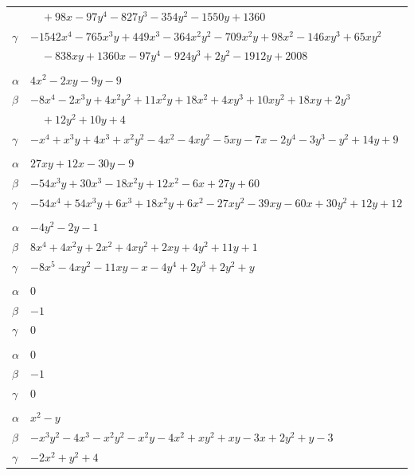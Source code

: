 \documentclass[11pt]{article}
\begin{document}
\begin{longtable}{@{}ll@{}}
 & $\quad +98x-97y^{4}-827y^{3}-354y^{2}-1550y+1360$\\
$\gamma$ & $-1542x^{4}-765x^{3}y+449x^{3}-364x^{2}y^{2}-709x^{2}y+98x^{2}-146xy^{3}+65xy^{2}$\\
 & $\quad -838xy+1360x-97y^{4}-924y^{3}+2y^{2}-1912y+2008$\\
\addlinespace[3pt]
\multicolumn{2}{@{}l}{$\{i,j\}=\{14,72\}$, $k_{ij}=3^{2}$}\\
$\alpha$ & $4x^{2}-2xy-9y-9$\\
$\beta$ & $-8x^{4}-2x^{3}y+4x^{2}y^{2}+11x^{2}y+18x^{2}+4xy^{3}+10xy^{2}+18xy+2y^{3}$\\
 & $\quad +12y^{2}+10y+4$\\
$\gamma$ & $-x^{4}+x^{3}y+4x^{3}+x^{2}y^{2}-4x^{2}-4xy^{2}-5xy-7x-2y^{4}-3y^{3}-y^{2}+14y+9$\\
\addlinespace[3pt]
\multicolumn{2}{@{}l}{$\{i,j\}=\{14,73\}$, $k_{ij}=3^{2}$}\\
$\alpha$ & $27xy+12x-30y-9$\\
$\beta$ & $-54x^{3}y+30x^{3}-18x^{2}y+12x^{2}-6x+27y+60$\\
$\gamma$ & $-54x^{4}+54x^{3}y+6x^{3}+18x^{2}y+6x^{2}-27xy^{2}-39xy-60x+30y^{2}+12y+12$\\
\addlinespace[3pt]
\multicolumn{2}{@{}l}{$\{i,j\}=\{14,74\}$, $k_{ij}=1$}\\
$\alpha$ & $-4y^{2}-2y-1$\\
$\beta$ & $8x^{4}+4x^{2}y+2x^{2}+4xy^{2}+2xy+4y^{2}+11y+1$\\
$\gamma$ & $-8x^{5}-4xy^{2}-11xy-x-4y^{4}+2y^{3}+2y^{2}+y$\\
\addlinespace[3pt]
\multicolumn{2}{@{}l}{$\{i,j\}=\{19,50\}$, $k_{ij}=1$}\\
$\alpha$ & $0$\\
$\beta$ & $-1$\\
$\gamma$ & $0$\\
\addlinespace[3pt]
\multicolumn{2}{@{}l}{$\{i,j\}=\{19,97\}$, $k_{ij}=1$}\\
$\alpha$ & $0$\\
$\beta$ & $-1$\\
$\gamma$ & $0$\\
\addlinespace[3pt]
\multicolumn{2}{@{}l}{$\{i,j\}=\{26,33\}$, $k_{ij}=3$}\\
$\alpha$ & $x^{2}-y$\\
$\beta$ & $-x^{3}y^{2}-4x^{3}-x^{2}y^{2}-x^{2}y-4x^{2}+xy^{2}+xy-3x+2y^{2}+y-3$\\
$\gamma$ & $-2x^{2}+y^{2}+4$\\

\end{longtable}
\end{document}

